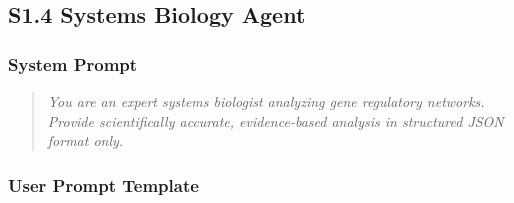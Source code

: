 \documentclass[11pt]{article}
\begin{document}
\subsection{S1.4 Systems Biology Agent}

\subsubsection{System Prompt}

\begin{quote}
\textit{You are an expert systems biologist analyzing gene regulatory networks. Provide scientifically accurate, evidence-based analysis in structured JSON format only.}
\end{quote}

\subsubsection{User Prompt Template}
\end{document}
